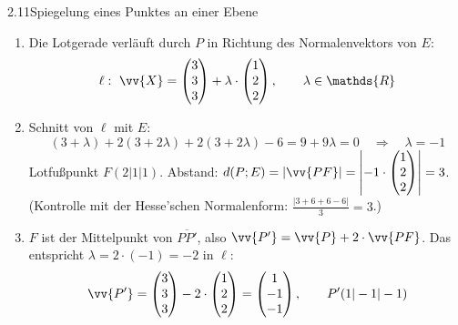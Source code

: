 \begin{loesung}{2.11}{Spiegelung eines Punktes an einer Ebene}
\begin{enumerate}[label=\alph*)]
  \item Die Lotgerade verläuft durch $P$ in Richtung des Normalenvektors von $E$:
  \[\ell:\ \vv{X} = \begin{pmatrix} 3\\ 3\\ 3\end{pmatrix}+\lambda\cdot\begin{pmatrix} 1\\ 2\\ 2\end{pmatrix},\qquad\lambda\in\mathds{R}\]
  \item Schnitt von $\ell$ mit $E$:
  \[(3+\lambda)+2(3+2\lambda)+2(3+2\lambda)-6 = 9+9\lambda = 0\quad\Longrightarrow\quad\lambda = -1\]
  Lotfußpunkt $F(2|1|1)$. Abstand: $d(P;E) = |\vv{PF}| = \left|-1\cdot\begin{pmatrix} 1\\ 2\\ 2\end{pmatrix}\right| = 3$.\\
  (Kontrolle mit der Hesse'schen Normalenform: $\frac{|3+6+6-6|}{3} = 3$.)
  \item $F$ ist der Mittelpunkt von $\overline{PP'}$, also $\vv{P'} = \vv{P}+2\cdot\vv{PF}$. Das entspricht $\lambda = 2\cdot(-1) = -2$ in $\ell$:
  \[\vv{P'} = \begin{pmatrix} 3\\ 3\\ 3\end{pmatrix}-2\cdot\begin{pmatrix} 1\\ 2\\ 2\end{pmatrix} = \begin{pmatrix} 1\\ -1\\ -1\end{pmatrix},\qquad P'(1|-1|-1)\]
\end{enumerate}
\end{loesung}

